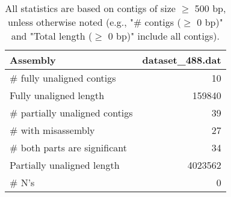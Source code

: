 \documentclass[12pt,a4paper]{article}
\begin{document}
\begin{table}[ht]
\begin{center}
\caption{All statistics are based on contigs of size $\geq$ 500 bp, unless otherwise noted (e.g., "\# contigs ($\geq$ 0 bp)" and "Total length ($\geq$ 0 bp)" include all contigs).}
\begin{tabular}{|l*{1}{|r}|}
\hline
Assembly & dataset\_488.dat \\ \hline
\# fully unaligned contigs & 10 \\ \hline
Fully unaligned length & 159840 \\ \hline
\# partially unaligned contigs & 39 \\ \hline
\hspace{5mm}\# with misassembly & 27 \\ \hline
\hspace{5mm}\# both parts are significant & 34 \\ \hline
Partially unaligned length & 4023562 \\ \hline
\# N's & 0 \\ \hline
\end{tabular}
\end{center}
\end{table}
\end{document}
